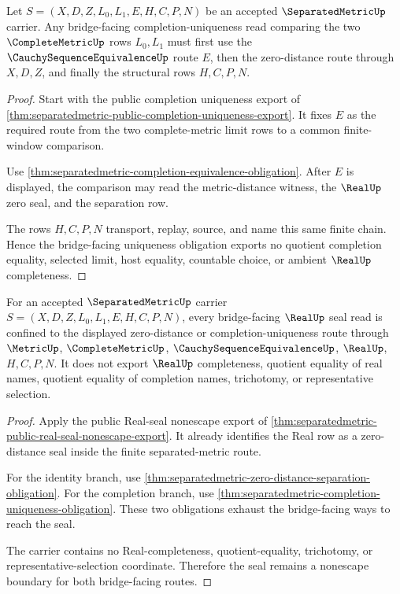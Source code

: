 \begin{theorem}
\label{thm:separatedmetric-completion-uniqueness-obligation}
Let $S=(X,D,Z,L_0,L_1,E,H,C,P,N)$ be an accepted $\SeparatedMetricUp$ carrier. Any bridge-facing completion-uniqueness read comparing the two $\CompleteMetricUp$ rows $L_0,L_1$ must first use the $\CauchySequenceEquivalenceUp$ route $E$, then the zero-distance route through $X,D,Z$, and finally the structural rows $H,C,P,N$.
\end{theorem}
\begin{proof}
Start with the public completion uniqueness export of \autoref{thm:separatedmetric-public-completion-uniqueness-export}. It fixes $E$ as the required route from the two complete-metric limit rows to a common finite-window comparison.

Use \autoref{thm:separatedmetric-completion-equivalence-obligation}. After $E$ is displayed, the comparison may read the metric-distance witness, the $\RealUp$ zero seal, and the separation row.

The rows $H,C,P,N$ transport, replay, source, and name this same finite chain. Hence the bridge-facing uniqueness obligation exports no quotient completion equality, selected limit, host equality, countable choice, or ambient $\RealUp$ completeness.
\end{proof}

\begin{theorem}
\label{thm:separatedmetric-real-seal-nonescape-obligation}
For an accepted $\SeparatedMetricUp$ carrier $S=(X,D,Z,L_0,L_1,E,H,C,P,N)$, every bridge-facing $\RealUp$ seal read is confined to the displayed zero-distance or completion-uniqueness route through $\MetricUp$, $\CompleteMetricUp$, $\CauchySequenceEquivalenceUp$, $\RealUp$, $H,C,P,N$. It does not export $\RealUp$ completeness, quotient equality of real names, quotient equality of completion names, trichotomy, or representative selection.
\end{theorem}
\begin{proof}
Apply the public Real-seal nonescape export of \autoref{thm:separatedmetric-public-real-seal-nonescape-export}. It already identifies the Real row as a zero-distance seal inside the finite separated-metric route.

For the identity branch, use \autoref{thm:separatedmetric-zero-distance-separation-obligation}. For the completion branch, use \autoref{thm:separatedmetric-completion-uniqueness-obligation}. These two obligations exhaust the bridge-facing ways to reach the seal.

The carrier contains no Real-completeness, quotient-equality, trichotomy, or representative-selection coordinate. Therefore the seal remains a nonescape boundary for both bridge-facing routes.
\end{proof}


